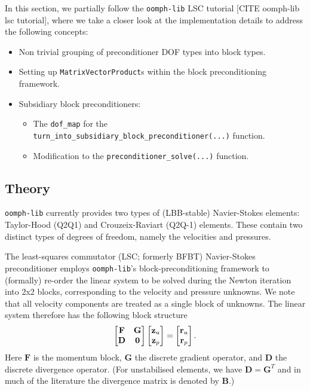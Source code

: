 In this section, we partially follow the \verb+oomph-lib+ LSC tutorial [CITE oomph-lib lsc tutorial], where we take a closer look at the implementation details to address the following concepts:
\begin{itemize}
\item Non trivial grouping of preconditioner DOF types into block types.
\item Setting up \verb+MatrixVectorProduct+s within the block preconditioning framework.
\item Subsidiary block preconditioners:
 \begin{itemize}
 \item The \verb+dof_map+ for the \verb+turn_into_subsidiary_block_preconditioner(...)+ function.
 \item Modification to the \verb+preconditioner_solve(...)+ function.
 \end{itemize}
\end{itemize}

\subsection{Theory\label{sec:lsc_theory}}
\verb+oomph-lib+ currently provides two types of (LBB-stable)
Navier-Stokes elements: Taylor-Hood (Q2Q1) and Crouzeix-Raviart
(Q2Q-1) elements. These contain two distinct types of degrees of freedom,
namely the velocities and pressures.

The least-squares commutator (LSC; formerly BFBT) Navier-Stokes 
preconditioner employs \verb+oomph-lib+'s block-preconditioning framework
to (formally) re-order the linear system to be solved during the
Newton iteration into 2x2 blocks, corresponding to the velocity 
and pressure unknowns. We note that all velocity components are 
treated as a single block of unknowns. The linear system
therefore has the following block structure
\begin{equation*}
\begin{bmatrix}
{\bf F} & {\bf G} \\ {\bf D} & {\bf 0} 
\end{bmatrix}
\begin{bmatrix}
{\bf z}_u \\ {\bf z}_p
\end{bmatrix} 
 =
\begin{bmatrix}
{\bf r}_u \\ {\bf r}_p
\end{bmatrix} 
.
\end{equation*}
Here $\mathbf{F}$ is the momentum block, $\mathbf{G}$ the
discrete gradient operator, and $\mathbf{D}$ the discrete
divergence operator. (For unstabilised elements, we have 
$\mathbf{D} = \mathbf{G}^T$ and in much of the literature
the divergence matrix is denoted by $\mathbf{B}$.)

